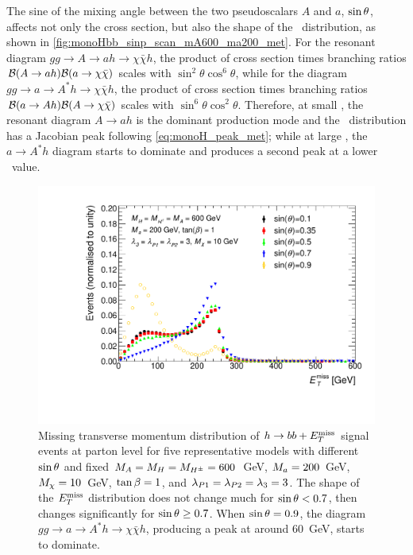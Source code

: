 The sine of the mixing angle between the two pseudoscalars $A$ and $a$, $\sinp$,
affects not only the cross section, but also the shape of the \MET\ distribution, as shown in \autoref{fig:monoHbb_sinp_scan_mA600_ma200_met}. 
For the resonant diagram $gg\rightarrow A \rightarrow ah \rightarrow \chi\bar{\chi}h$, 
the product of cross section times branching ratios 
${\cal B}(A\rightarrow ah){\cal B}(a \rightarrow \chi\bar{\chi})$ 
scales with $\sin^2\theta\cos^6\theta$, while for the diagram 
$gg\rightarrow a \rightarrow A^*h \rightarrow \chi\bar{\chi}h$, the 
product of cross section times branching ratios 
${\cal B}(a\rightarrow Ah){\cal B}(A \rightarrow \chi\bar{\chi})$ 
scales with $\sin^6\theta\cos^2\theta$. Therefore, at small \sinp, the resonant 
diagram $A\rightarrow ah$ is the dominant production mode and the \MET\ distribution 
has a Jacobian peak following \autoref{eq:monoH_peak_met}; while at large \sinp, the 
$a\rightarrow A^*h$ diagram starts to dominate and produces a second peak at a lower 
\MET\ value.


\begin{figure}[tbp]
\centering
\includegraphics[width=\textwidth]{texinputs/04_grid/figures/monoHbb_sinp_scan_MA600_Ma200_MET_liny_norm2one.pdf}
\caption[$\MET$ distribution in $h\rightarrow bb + \MET$ events for different 
$\sinp$ for $\mA = \mH = \mHc = 600 $ GeV and $\ma = 200$ GeV]
{
Missing transverse momentum distribution of $h\rightarrow bb + \MET$ signal 
events at parton level for five representative models with different $\sinp$ and
 fixed $\mA = \mH = \mHc = 600 $~GeV, $\ma = 200$~GeV, $ M_{\chi} = 10$~GeV, $\tan\beta = 1$, 
and $ \lambda_{P1} = \lambda_{P2} = \lambda_{3} = 3 $. 
The shape of the $\MET$ distribution does not change much  
for $\sin\theta < 0.7$, then changes significantly for $\sin\theta\geq 0.7$. 
When $\sin\theta=0.9$, the diagram $gg\rightarrow a\rightarrow A^*h \rightarrow \chi \bar{\chi} h$, 
producing a \MET peak at around 60~GeV, starts to dominate.
%
}
\label{fig:monoHbb_sinp_scan_mA600_ma200_met}
\end{figure}



